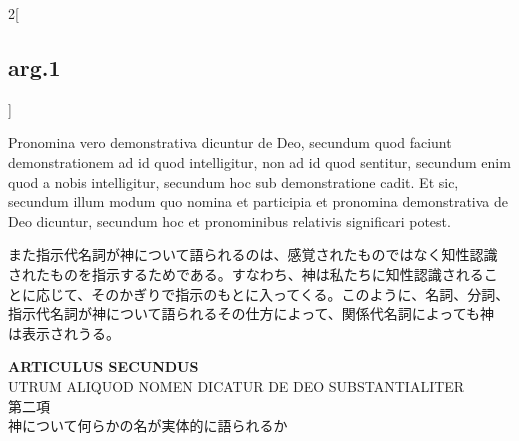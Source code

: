 \documentclass[paper=a4paper,fontsize=10pt,jafontsize=9pt,titlepage]{jlreq}
\begin{document}
\begin{paracol}{2}[\subsection{arg.1}]
\switchcolumn*

Pronomina vero demonstrativa dicuntur de Deo, secundum quod faciunt
demonstrationem ad id quod intelligitur, non ad id quod sentitur,
secundum enim quod a nobis intelligitur, secundum hoc sub
demonstratione cadit. Et sic, secundum illum modum quo nomina et
participia et pronomina demonstrativa de Deo dicuntur, secundum hoc et
pronominibus relativis significari potest.

\switchcolumn

また指示代名詞が神について語られるのは、感覚されたものではなく知性認識
されたものを指示するためである。すなわち、神は私たちに知性認識されるこ
とに応じて、そのかぎりで指示のもとに入ってくる。このように、名詞、分詞、
指示代名詞が神について語られるその仕方によって、関係代名詞によっても神
は表示されうる。

\end{paracol}

\newpage
{}

\begin{center}
{\Large {\bfseries ARTICULUS SECUNDUS}}\\
{\large UTRUM ALIQUOD NOMEN DICATUR DE DEO SUBSTANTIALITER\\
第二項\\
神について何らかの名が実体的に語られるか}
\end{center}

{}
\setcounter{section}{2}
\setcounter{subsection}{0}
\end{document}
